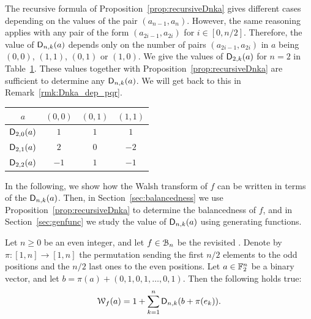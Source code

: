\documentclass[11pt]{llncs}
\begin{document}
\begin{remark}\label{rmk:dependence_dnka}
    The recursive formula of Proposition~\ref{prop:recursiveDnka} gives different cases depending on the values of the pair $(a_{n-1},a_n)$. However, the same reasoning applies with any pair of the form $(a_{2i-1}, a_{2i})$ for $i\in[0,n/2]$. Therefore, the value of $\mathsf{D}_{n,k}(a)$ depends only on the number of pairs $(a_{2i-1}, a_{2i})$ in $a$ being $(0,0)$, $(1,1)$, $(0,1)$ or $(1,0)$. We give the values of $\mathsf{D}_{2,k}(a)$ for $n=2$ in Table~\ref{tab:Dnka}. These values together with Proposition~\ref{prop:recursiveDnka} are sufficient to determine any $\mathsf{D}_{n,k}(a)$. We will get back to this in Remark~\ref{rmk:Dnka_dep_pqr}.
\end{remark}

\begin{table}
	\centering
	\begin{tabular}{|c|c|c|c|}
		\hline
		$a$ & $(0,0)$ & $(0,1)$ & $(1,1)$ \\ \hline
		$\mathsf{D}_{2,0}(a)$ &$1$&$1$ & $1$\\
		$\mathsf{D}_{2,1}(a)$ &$2$& $0$ & $-2$\\
		$\mathsf{D}_{2,2}(a)$ &$-1$&$1$ & $-1$\\
	\end{tabular}
	\label{tab:Dnka}
\end{table}

In the following, we show how the Walsh transform of $f$ can be written in terms of the $\mathsf{D}_{n,k}(a)$. Then, in Section~\ref{sec:balancedness} we use Proposition~\ref{prop:recursiveDnka} to determine the balancedness of $f$, and in Section~\ref{sec:genfunc} we study the value of $\mathsf{D}_{n,k}(a)$ using generating functions.

\begin{proposition}\label{prop:WT}
    Let $n\geq 0$ be an even integer, and let $f\in\mathcal{B}_n$ be the revisited \hwbf{}. Denote by $\pi:[1,n]\to[1,n]$ the permutation sending the first $n/2$ elements to the odd positions and the $n/2$ last ones to the even positions. Let $a\in\mathbb{F}_2^n$ be a binary vector, and let $b=\pi(a)+(0,1,0,1,\ldots,0,1)$. Then the following holds true:
	\[ \mathcal W_{f}(a)=1+\sum_{k=1}^n \mathsf{D}_{n,k}(b+\pi(e_k)).\]
\end{proposition}
\end{document}
